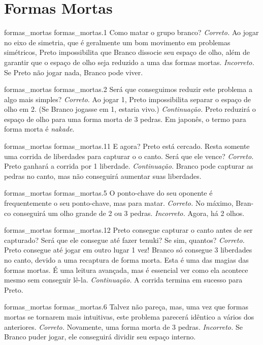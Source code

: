 \chapter{Formas Mortas}

\emptypage

\problemAnswerDiagram
  {formas_mortas}
  {formas_mortas.1}
  {Como matar o grupo branco?}
  {\emph{Correto.} Ao jogar no eixo de simetria, que é geralmente um bom movimento em problemas simétricos, Preto impossibilita que Branco dissocie seu espaço de olho, além de garantir que o espaço de olho seja reduzido a uma das formas mortas.}
  {\emph{Incorreto.} Se Preto não jogar nada, Branco pode viver.}

\problemAnswerDiagram
  {formas_mortas}
  {formas_mortas.2}
  {Será que conseguimos reduzir este problema a algo mais simples?}
  {\emph{Correto.} Ao jogar 1, Preto impossibilita separar o espaço de olho em 2. (Se Branco jogasse em 1, estaria vivo.)}
  {\emph{Continuação.} Preto reduzirá o espaço de olho para uma forma morta de 3 pedras. Em japonês, o termo para forma morta é \emph{nakade}.}

\problemAnswerDiagram
  {formas_mortas}
  {formas_mortas.11}
  {E agora? Preto está cercado. Resta somente uma corrida de liberdades para capturar o o canto. Será que ele vence?}
  {\emph{Correto.} Preto ganhará a corrida por 1 liberdade.}
  {\emph{Continuação.} Branco pode capturar as pedras no canto, mas não conseguirá aumentar suas liberdades.}

\problemAnswerDiagram
  {formas_mortas}
  {formas_mortas.5}
  {O ponto-chave do seu oponente é frequentemente o seu ponto-chave, mas para matar.}
  {\emph{Correto.} No máximo, Bran-co conseguirá um olho grande de 2 ou 3 pedras.}
  {\emph{Incorreto.} Agora, há 2 olhos.}

\problemAnswerDiagram
  {formas_mortas}
  {formas_mortas.12}
  {Preto consegue capturar o canto antes de ser capturado? Será que ele consegue até fazer tenuki? Se sim, quantos?}
  {\emph{Correto.} Preto consegue até jogar em outro lugar 1 vez! Branco só consegue 3 liberdades no canto, devido a uma recaptura de forma morta. Esta é uma das magias das formas mortas. É uma leitura avançada, mas é essencial ver como ela acontece mesmo sem conseguir lê-la.}
  {\emph{Continuação.} A corrida termina em sucesso para Preto.}

\problemAnswerDiagram
  {formas_mortas}
  {formas_mortas.6}
  {Talvez não pareça, mas, uma vez que formas mortas se tornarem mais intuitivas, este problema parecerá idêntico a vários dos anteriores.}
  {\emph{Correto.} Novamente, uma forma morta de 3 pedras.}
  {\emph{Incorreto.} Se Branco puder jogar, ele conseguirá dividir seu espaço interno.}

